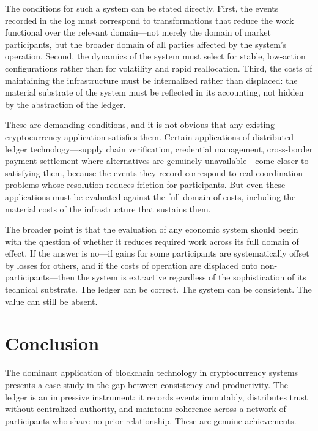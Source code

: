 \documentclass[12pt, oneside]{article}
\theoremstyle{definition}
\begin{document}
The conditions for such a system can be stated directly. First, the events recorded in the log must correspond to transformations that reduce the work functional over the relevant domain---not merely the domain of market participants, but the broader domain of all parties affected by the system's operation. Second, the dynamics of the system must select for stable, low-action configurations rather than for volatility and rapid reallocation. Third, the costs of maintaining the infrastructure must be internalized rather than displaced: the material substrate of the system must be reflected in its accounting, not hidden by the abstraction of the ledger.

These are demanding conditions, and it is not obvious that any existing cryptocurrency application satisfies them. Certain applications of distributed ledger technology---supply chain verification, credential management, cross-border payment settlement where alternatives are genuinely unavailable---come closer to satisfying them, because the events they record correspond to real coordination problems whose resolution reduces friction for participants. But even these applications must be evaluated against the full domain of costs, including the material costs of the infrastructure that sustains them.

The broader point is that the evaluation of any economic system should begin with the question of whether it reduces required work across its full domain of effect. If the answer is no---if gains for some participants are systematically offset by losses for others, and if the costs of operation are displaced onto non-participants---then the system is extractive regardless of the sophistication of its technical substrate. The ledger can be correct. The system can be consistent. The value can still be absent.

\section{Conclusion}

The dominant application of blockchain technology in cryptocurrency systems presents a case study in the gap between consistency and productivity. The ledger is an impressive instrument: it records events immutably, distributes trust without centralized authority, and maintains coherence across a network of participants who share no prior relationship. These are genuine achievements.
\end{document}
